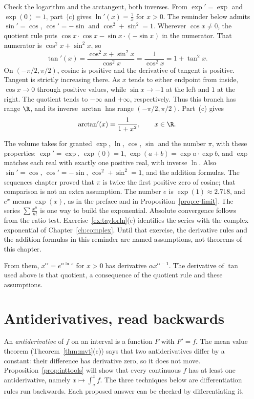 Check the logarithm and the arctangent, both inverses. From $\exp'=\exp$ and $\exp(0)=1$, part~(c) gives $\ln'(x)=\frac1x$ for $x>0$. The reminder below admits $\sin'=\cos$, $\cos'=-\sin$ and $\cos^2+\sin^2=1$. Wherever $\cos x\ne0$, the quotient rule puts $\cos x\cdot\cos x-\sin x\cdot(-\sin x)$ in the numerator. That numerator is $\cos^2 x+\sin^2 x$, so
\[
\tan'(x)=\frac{\cos^2 x+\sin^2 x}{\cos^2 x}=\frac1{\cos^2 x}=1+\tan^2 x.
\]
On $(-\pi/2,\pi/2)$, cosine is positive and the derivative of tangent is positive. Tangent is strictly increasing there. As $x$ tends to either endpoint from inside, $\cos x\to0$ through positive values, while $\sin x\to-1$ at the left and $1$ at the right. The quotient tends to $-\infty$ and $+\infty$, respectively. Thus this branch has range $\R$, and its inverse $\arctan$ has range $(-\pi/2,\pi/2)$. Part~(c) gives
\[
\arctan'(x)=\frac1{1+x^2},\qquad x\in\R.
\]

\begin{reminder}
The volume takes for granted $\exp$, $\ln$, $\cos$, $\sin$ and the number $\pi$, with these properties: $\exp'=\exp$, $\exp(0)=1$, $\exp(a+b)=\exp a\cdot\exp b$, and $\exp$ matches each real with exactly one positive real, with inverse $\ln$. Also $\sin'=\cos$, $\cos'=-\sin$, $\cos^2+\sin^2=1$, and the addition formulas. The sequences chapter proved that $\pi$ is twice the first positive zero of cosine; that comparison is not an extra assumption. The number $e$ is $\exp(1)\approx 2.718$, and $e^x$ means $\exp(x)$, as in the preface and in Proposition~\ref{prop:e-limit}. The series $\sum\frac{x^n}{n!}$ is one way to build the exponential. Absolute convergence follows from the ratio test. Exercise~\ref{ex:taylorln}(c) identifies the series with the complex exponential of Chapter~\ref{ch:complex}. Until that exercise, the derivative rules and the addition formulas in this reminder are named assumptions, not theorems of this chapter.

From them, $x^\alpha=e^{\alpha\ln x}$ for $x>0$ has derivative $\alpha x^{\alpha-1}$. The derivative of $\tan$ used above is that quotient, a consequence of the quotient rule and these assumptions.
\end{reminder}

\section{Antiderivatives, read backwards}

An \emph{antiderivative} of $f$ on an interval is a function $F$ with $F'=f$. The mean value theorem (Theorem~\ref{thm:mvt}(c)) says that two antiderivatives differ by a constant: their difference has derivative zero, so it does not move. Proposition~\ref{prop:inttools} will show that every continuous $f$ has at least one antiderivative, namely $x\mapsto\int_a^x f$. The three techniques below are differentiation rules run backwards. Each proposed answer can be checked by differentiating it.

